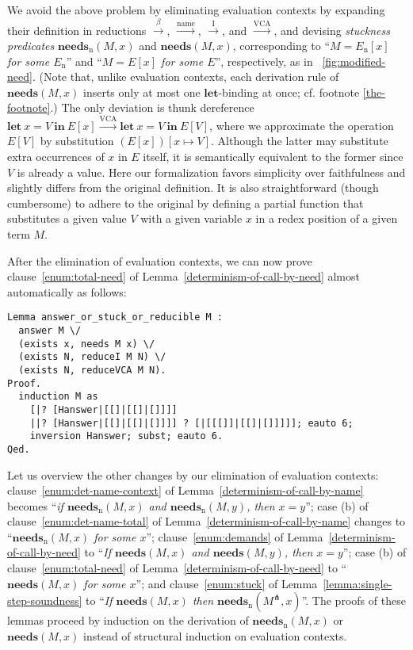 \documentclass[english]{sumiilab-paper}
\newcommand{\LET}[3]{\mathbf{let}~#1=#2~\mathbf{in}~#3}
\newcommand{\EXPANDLET}[1]{#1^\pitchfork}
\newcommand{\FULLBETA}{\xrightarrow{\beta}}
\newcommand{\CALLBYNAME}{\xrightarrow{\mathrm{name}}}
\newcommand{\CALLBYNEEDI}{\xrightarrow{\mathrm{I}}}
\newcommand{\CALLBYNEEDVCA}{\xrightarrow{\mathrm{VCA}}}
\newcommand{\DEMAND}[2]{\mathbf{needs}(#2, #1)}
\newcommand{\STUCK}[2]{\mathbf{needs}_\mathrm{n}(#2, #1)}
\newcommand{\lemmaname}{Lemma}
\begin{document}
We avoid the above problem by eliminating evaluation contexts by expanding their definition in reductions $\FULLBETA$, $\CALLBYNAME$, $\CALLBYNEEDI$, and $\CALLBYNEEDVCA$, and devising \emph{stuckness predicates} $\STUCK{x}{M}$ and $\DEMAND{x}{M}$, corresponding to ``\emph{$M=E_\mathrm{n}[x]$ for some $E_\mathrm{n}$}'' and ``\emph{$M=E[x]$ for some $E$}'', respectively, as in \figurename~\ref{fig:modified-need}.
(Note that, unlike evaluation contexts, each derivation rule of $\DEMAND{x}{M}$ inserts only at most one $\mathbf{let}$-binding at once; cf. footnote {\ref{the-footnote}}.)
The only deviation is thunk dereference
$\LET{x}{V}{E[x]} \CALLBYNEEDVCA \LET{x}{V}{E[V]}$, where we approximate the operation $E[V]$ by substitution $(E[x])[x\mapsto V]$.  Although the latter may substitute extra occurrences of $x$ in $E$ itself, it is semantically equivalent to the former since $V$ is already a value.
Here our formalization favors simplicity over faithfulness and slightly differs from the original definition.  It is also straightforward (though cumbersome) to adhere to the original by defining a partial function that substitutes a given value $V$ with a given variable $x$ in a redex position of a given term $M$.

After the elimination of evaluation contexts, we can now prove clause~\ref{enum:total-need} of \lemmaname~\ref{determinism-of-call-by-need} almost automatically as follows:
\begin{verbatim}
Lemma answer_or_stuck_or_reducible M :
  answer M \/
  (exists x, needs M x) \/
  (exists N, reduceI M N) \/
  (exists N, reduceVCA M N).
Proof.
  induction M as
    [|? [Hanswer|[[]|[[]|[]]]]
    ||? [Hanswer|[[]|[[]|[]]]] ? [|[[[]]|[[]|[]]]]]; eauto 6;
    inversion Hanswer; subst; eauto 6.
Qed.
\end{verbatim}

Let us overview the other changes by our elimination of evaluation contexts:
clause~\ref{enum:det-name-context} of \lemmaname~\ref{determinism-of-call-by-name} becomes ``\emph{if $\STUCK{x}{M}$ and $\STUCK{y}{M}$, then $x=y$}'';
case
(b) %
of clause~\ref{enum:det-name-total} of \lemmaname~\ref{determinism-of-call-by-name} changes to ``\emph{$\STUCK{x}{M}$ for some $x$}'';
clause~\ref{enum:demands} of \lemmaname~\ref{determinism-of-call-by-need} to ``\emph{If $\DEMAND{x}{M}$ and $\DEMAND{y}{M}$, then $x=y$}'';
case
(b) %
of clause~\ref{enum:total-need} of \lemmaname~\ref{determinism-of-call-by-need} to ``\emph{$\DEMAND{x}{M}$ for some $x$}'';
and clause~\ref{enum:stuck} of \lemmaname~\ref{lemma:single-step-soundness} to ``\emph{If $\DEMAND{x}{M}$ then $\STUCK{x}{\EXPANDLET{M}}$}''.
The proofs of these lemmas proceed by induction on the derivation of $\STUCK{x}{M}$ or $\DEMAND{x}{M}$ instead of structural induction on evaluation contexts.
\end{document}
